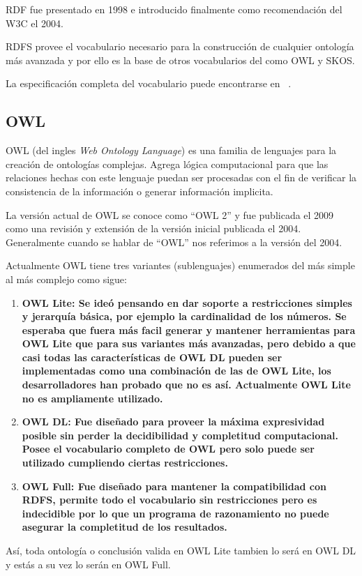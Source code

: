 RDF fue presentado en 1998 e introducido finalmente como recomendación del W3C
el 2004\cite{bikakis2013semantic}.

RDFS provee el vocabulario necesario para la construcción de cualquier ontología
más avanzada y por ello es la base de otros vocabularios del como OWL y SKOS.

La especificación completa del vocabulario puede encontrarse en ~\cite{brickley2014rdfs}.

\subsection{OWL}
OWL (del ingles \emph{Web Ontology Language}) es una familia de lenguajes para
la creación de ontologías complejas.
Agrega lógica computacional para que las relaciones
hechas con este lenguaje puedan ser procesadas con el fin de verificar la
consistencia de la información o generar información implicita.

La versión actual de OWL se conoce como ``OWL 2'' y fue publicada el 2009 como 
una revisión y extensión de la versión inicial publicada el
2004\cite{bikakis2013semantic}. Generalmente cuando se hablar de ``OWL'' nos
referimos a la versión del 2004.

Actualmente OWL tiene tres variantes (sublenguajes) enumerados del más simple al
más complejo como sigue\cite{mcguiness2004owl}:
\begin{enumerate}
  \item \bf{OWL Lite}:
    Se ideó pensando en dar soporte a restricciones simples y jerarquía básica,
    por ejemplo la cardinalidad de los números. 
    Se esperaba que fuera más facil generar y mantener herramientas para OWL
    Lite que para sus variantes más avanzadas, pero debido a que casi todas las
    características de OWL DL pueden ser implementadas como una combinación de
    las de OWL Lite, los desarrolladores han probado que no es 
    así\cite{grau2008owl}. Actualmente OWL Lite no es ampliamente utilizado.
  \item \bf{OWL DL}:
    Fue diseñado para proveer la máxima expresividad posible sin perder la
    decidibilidad y completitud computacional. Posee el vocabulario completo de
    OWL pero solo puede ser utilizado cumpliendo ciertas restricciones.
  \item \bf{OWL Full}:
    Fue diseñado para mantener la compatibilidad con RDFS, permite todo el
    vocabulario sin restricciones pero es indecidible por lo que un programa de
    razonamiento no puede asegurar la completitud de los resultados.
\end{enumerate}
Así, toda ontología o conclusión valida en OWL Lite tambien lo será en OWL DL y
estás a su vez lo serán en OWL Full.

